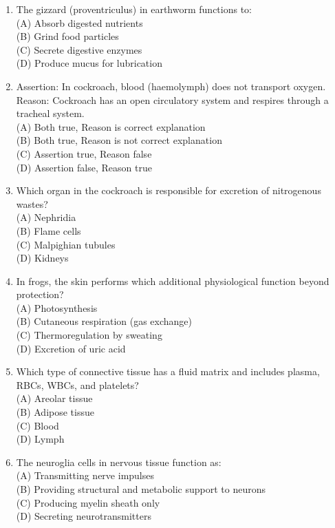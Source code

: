 \documentclass{article}
\begin{document}
\begin{enumerate}[label=Q\arabic*.]
\item The gizzard (proventriculus) in earthworm functions to:
\\(A) Absorb digested nutrients
\\(B) Grind food particles
\\(C) Secrete digestive enzymes
\\(D) Produce mucus for lubrication

\item Assertion: In cockroach, blood (haemolymph) does not transport oxygen.\\
Reason: Cockroach has an open circulatory system and respires through a tracheal system.
\\(A) Both true, Reason is correct explanation
\\(B) Both true, Reason is not correct explanation
\\(C) Assertion true, Reason false
\\(D) Assertion false, Reason true

\item Which organ in the cockroach is responsible for excretion of nitrogenous wastes?
\\(A) Nephridia
\\(B) Flame cells
\\(C) Malpighian tubules
\\(D) Kidneys

\item In frogs, the skin performs which additional physiological function beyond protection?
\\(A) Photosynthesis
\\(B) Cutaneous respiration (gas exchange)
\\(C) Thermoregulation by sweating
\\(D) Excretion of uric acid

\item Which type of connective tissue has a fluid matrix and includes plasma, RBCs, WBCs, and platelets?
\\(A) Areolar tissue
\\(B) Adipose tissue
\\(C) Blood
\\(D) Lymph

\item The neuroglia cells in nervous tissue function as:
\\(A) Transmitting nerve impulses
\\(B) Providing structural and metabolic support to neurons
\\(C) Producing myelin sheath only
\\(D) Secreting neurotransmitters


\end{enumerate}
\end{document}
